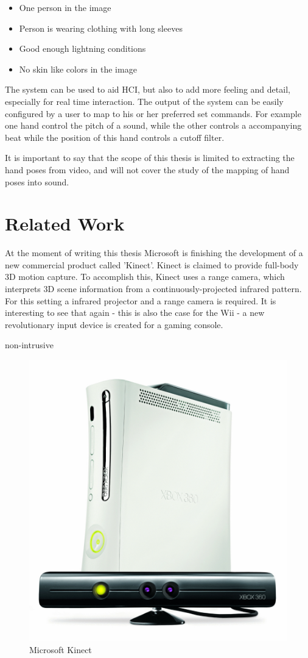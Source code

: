 \begin{itemize}
	\item One person in the image
	\item Person is wearing clothing with long sleeves
	\item Good enough lightning conditions
	\item No skin like colors in the image
\end{itemize}

The system can be used to aid HCI, but also to add more feeling and detail, especially for real time interaction. The output of the system can be easily configured by a user to map to his or her preferred set commands. For example one hand control the pitch of a sound, while the other controls a accompanying beat while the position of this hand controls a cutoff filter. 

It is important to say that the scope of this thesis is limited to extracting the hand poses from video, and will not cover the study of the mapping of hand poses into sound. 



\section{Related Work}
At the moment of writing this thesis Microsoft is finishing the development of a new commercial product called 'Kinect'. Kinect is claimed to provide full-body 3D motion capture. To accomplish this, Kinect uses a range camera, which interprets 3D scene information from a continuously-projected infrared pattern. For this setting a infrared projector and a range camera is required. It is interesting to see that again - this is also the case for the Wii - a new revolutionary input device is created for a gaming console. 

non-intrusive

\begin{figure}[htbp]
	\center{}
	\label{fig:kinect}
	\includegraphics[width=0.3\linewidth]{figures/wave.jpg}
	\caption{Microsoft Kinect}
\end{figure}


